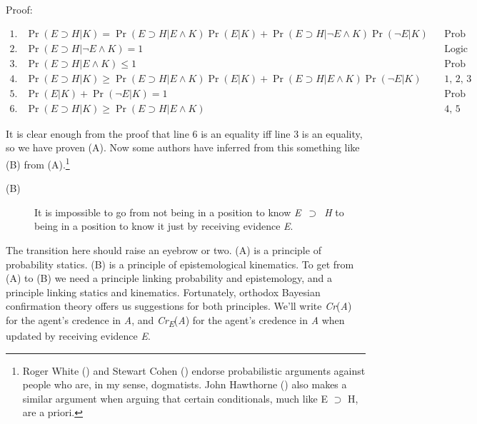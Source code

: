 \documentclass[
  11pt,
  letterpaper,
  DIV=11,
  numbers=noendperiod,
  oneside]{scrartcl}
\begin{document}
Proof:

\begin{figure*}

\[
\begin{aligned}
1. & \Pr(E \supset H | K) = \Pr(E \supset H | E \wedge K)\Pr(E | K) + \Pr(E \supset H | \neg E \wedge K)\Pr(\neg E | K) &&  \text{Prob theorem} \\
2. & \Pr(E \supset H | \neg E \wedge K) = 1 && \text{Logic} \\
3. & \Pr(E \supset H | E \wedge K) \leq 1  && \text{Prob theorem} \\
4. & \Pr(E \supset H | K)  \geq \Pr(E \supset H | E \wedge K)\Pr(E | K) + \Pr(E \supset H | E \wedge K)\Pr(\neg E | K)  && \text{1, 2, 3} \\
5. & \Pr(E | K) + \Pr(\neg E | K) = 1  && \text{Prob theorem} \\
6. & \Pr(E \supset H | K) \geq \Pr(E \supset H | E \wedge K) && \text{4, 5}
\end{aligned}
\]

\end{figure*}%

It is clear enough from the proof that line 6 is an equality iff line 3
is an equality, so we have proven (A). Now some authors have inferred
from this something like (B) from (A).\footnote{Roger White
  () and Stewart Cohen
  () endorse probabilistic arguments
  against people who are, in my sense, dogmatists. John Hawthorne
  () also makes a similar argument
  when arguing that certain conditionals, much like E \({\supset}\) H,
  are a priori.}

\begin{description}
\item[(B)]
It is impossible to go from not being in a position to know
\emph{E}~\({\supset}\)~\emph{H} to being in a position to know it just
by receiving evidence \emph{E}.
\end{description}

The transition here should raise an eyebrow or two. (A) is a principle
of probability statics. (B) is a principle of epistemological
kinematics. To get from (A) to (B) we need a principle linking
probability and epistemology, and a principle linking statics and
kinematics. Fortunately, orthodox Bayesian confirmation theory offers us
suggestions for both principles. We'll write \emph{Cr}(\emph{A}) for the
agent's credence in \emph{A}, and \emph{Cr\textsubscript{E}}(\emph{A})
for the agent's credence in \emph{A} when updated by receiving evidence
\emph{E}.
\end{document}
